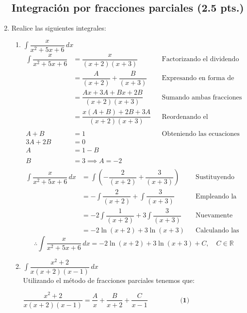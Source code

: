 \documentclass[letterpaper]{article}
\newcommand{\R}{\mathds{R}}
\renewcommand{\*}{\cdot}
\theoremstyle{definition}
\begin{document}
\begin{enumerate}
\subsection*{Integración por fracciones parciales (2.5 pts.)}
\item  Realice las siguientes integrales:
\begin{enumerate}
\item$\displaystyle \int \dfrac{x}{x^2 + 5x + 6} \, dx$
\begin{align*}
	\int \dfrac{x}{x^2 + 5x + 6} &= \dfrac{x}{(x+2)(x+3)} &&\text{Factorizando el dividendo}\\
	&= \dfrac{A}{(x+2)} + \dfrac{B}{(x+3)}&&\text{Expresando en forma de suma el dividendo}\\
	&= \dfrac{Ax + 3A + Bx + 2B}{(x+2)(x+3)} &&\text{Sumando ambas fracciones}\\
	&= \dfrac{x(A + B) + 2B + 3A}{(x+2)(x+3)} &&\text{Reordenando el numerador}\\ \\
	 A + B &= 1 &&\text{Obteniendo las ecuaciones }\\
	 3A + 2B &= 0 &&\text{ }\\
	 A &= 1 - B &&\text{ }\\ \\
	 B &= 3 \implies A = -2 &&\text{ }\\
\end{align*}
\begin{align*}
	\int \dfrac{x}{x^2 + 5x + 6} \, dx &= \int \left(-\dfrac{2}{(x+2)} + \dfrac{3}{(x+3)}\right) &&\text{Sustituyendo en la integral inicial}\\
	&= -\int\dfrac{2}{(x+2)} + \int\dfrac{3}{(x+3)} &&\text{Empleando la linealidad de la integral}\\
	&= -2\int\dfrac{1}{(x+2)} + 3\int\dfrac{3}{(x+3)} &&\text{Nuevamente empleando la linealidad de la integral}\\
	&= -2\ln(x + 2) + 3\ln(x+3) &&\text{Calculando las integrales que ya conocemos}
\end{align*}
\[ \therefore \int \dfrac{x}{x^2 + 5x + 6} \, dx =  -2\ln(x + 2) + 3\ln(x+3)  + C, \quad C \in \R \]
\item$\displaystyle \int \dfrac{x^2 +2}{x(x+2)(x-1)} \, dx$\\
Utilizando el método de fracciones parciales tenemos que:\\
\begin{center}
	$\dfrac{x^2 +2}{x(x+2)(x-1)}= \dfrac{A}{x}+\dfrac{B}{x+2}+\dfrac{C}{x-1}\hspace{2cm}{\textbf{(1)}}$

\end{center}
\end{enumerate}
\end{enumerate}
\end{document}
